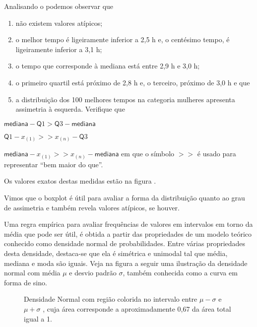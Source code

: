 Analisando o {\hyperref[\detokenize{PE104-6:fig-boxplotmulheres}]{}} podemos observar que
\begin{enumerate}
\item {} 
não existem valores atípicos;

\item {} 
o melhor tempo é ligeiramente inferior a 2,5 h e, o centésimo tempo, é ligeiramente inferior a 3,1 h;

\item {} 
o tempo que corresponde à mediana está entre 2,9 h e 3,0 h;

\item {} 
o primeiro quartil está próximo de 2,8 h e, o terceiro, próximo de 3,0 h e que

\item {} 
a distribuição dos 100 melhores tempos na categoria mulheres apresenta assimetria à esquerda. Verifique que

\end{enumerate}

\(\textsf{mediana} -\textsf{Q}1 > \textsf{Q}3-\textsf{mediana}\)

\(\textsf{Q}1-x_{(1)} >> x_{(n)}-\textsf{Q}3\)

\(\textsf{mediana}-x_{(1)}>> x_{(n)}-\textsf{mediana}\)  em que o símbolo \(>>\) é usado para representar “bem  maior do que”.

Os valores exatos destas medidas estão na figura {\hyperref[\detokenize{PE104-7:fig-medidasresumo4categorias}]{}}.

Vimos que o boxplot é útil para avaliar a forma da distribuição quanto ao grau de assimetria e também revela valores atípicos, se houver.

Uma regra empírica para avaliar frequências de valores em intervalos em torno da média que pode ser útil, é obtida a partir das propriedades de um modelo teórico conhecido como densidade normal de probabilidades. Entre várias propriedades desta densidade, destaca-se que ela é simétrica e unimodal tal que média, mediana e moda são iguais. Veja na figura a seguir uma ilustração da densidade normal com média \(\mu\) e desvio padrão \(\sigma\), também conhecida como a curva em forma de sino.

\begin{figure}[H]
\centering
\capstart

\noindent{}
\caption{Densidade Normal com região colorida no intervalo entre \(\mu-\sigma\) e \(\mu+\sigma\) , cuja área corresponde a aproximadamente 0,67 da área total igual a 1.}\label{\detokenize{PE104-6:fig-densidade-normal}}\label{\detokenize{PE104-6:id8}}\end{figure}

